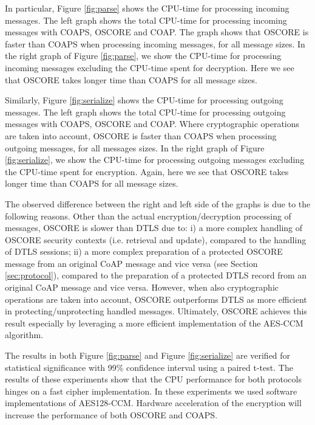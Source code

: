 {In particular, Figure \ref{fig:parse} shows the CPU-time for processing incoming messages. The left graph shows the total CPU-time for processing incoming messages with COAPS, OSCORE and COAP. The graph shows that OSCORE is faster than COAPS when processing incoming messages, for all message sizes. In the right graph of Figure \ref{fig:parse}, we show the CPU-time for processing incoming messages excluding the CPU-time spent for decryption. Here we see that OSCORE takes longer time than COAPS for all message sizes.

Similarly, Figure \ref{fig:serialize} shows the CPU-time for processing outgoing messages. The left graph shows the total CPU-time for processing outgoing messages with COAPS, OSCORE and COAP. Where cryptographic operations are taken into account, OSCORE is faster than COAPS when processing outgoing messages, for all messages sizes. In the right graph of Figure \ref{fig:serialize}, we show the CPU-time for processing outgoing messages excluding the CPU-time spent for encryption. Again, here we see that OSCORE takes longer time than COAPS for all message sizes. 

The observed difference between the right and left side of the graphs is due to the following reasons. Other than the actual encryption/decryption processing of messages, OSCORE is slower than DTLS due to: i) a more complex handling of OSCORE security contexts (i.e. retrieval and update), compared to the handling of DTLS sessions; ii) a more complex preparation of a protected OSCORE message from an original CoAP message and vice versa (see Section \ref{sec:protocol}), compared to the preparation of a protected DTLS record from an original CoAP message and vice versa. However, when also cryptographic operations are taken into account, OSCORE outperforms DTLS as more efficient in protecting/unprotecting handled messages. Ultimately, OSCORE achieves this result especially by leveraging a more efficient implementation of the AES-CCM algorithm.

The results in both Figure \ref{fig:parse} and Figure \ref{fig:serialize} are verified for statistical significance with 99\% confidence interval using a paired t-test. The results of these experiments show that the CPU performance for both protocols hinges on a fast cipher implementation. In these experiments we used software implementations of AES128-CCM. Hardware acceleration of the encryption will increase the performance of both OSCORE and COAPS.

}
